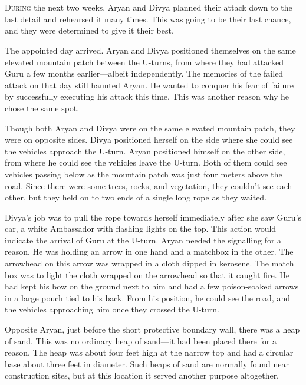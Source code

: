 \chapter{}

\lettrine{D}{uring} the next two weeks, Aryan and Divya planned their attack
down to the last detail and rehearsed it many times. This was going to be their
last chance, and they were determined to give it their best.

The appointed day arrived. Aryan and Divya positioned themselves on the same
elevated mountain patch between the U-turns, from where they had attacked Guru a
few months earlier—albeit independently. The memories of the failed attack on
that day still haunted Aryan. He wanted to conquer his fear of failure by
successfully executing his attack this time. This was another reason why he
chose the same spot.

Though both Aryan and Divya were on the same elevated mountain patch, they were
on opposite sides. Divya positioned herself on the side where she could
see the vehicles approach the U-turn. Aryan positioned himself on the other side,
from where he could see the vehicles leave the U-turn.  Both of them could see
vehicles passing below as the mountain patch was just four meters above the
road. Since there were some trees, rocks, and vegetation, they couldn't see each
other, but they held on to two ends of a single long rope as they waited.

Divya's job was to pull the rope towards herself immediately after she saw
Guru's car, a white Ambassador with flashing lights on the top. This action
would indicate the arrival of Guru at the U-turn. Aryan needed the signalling
for a reason. He was holding an arrow in one hand and a matchbox in the other.
The arrowhead on this arrow was wrapped in a cloth dipped in kerosene. The match
box was to light the cloth wrapped on the arrowhead so that it caught fire. He
had kept his bow on the ground next to him and had a few poison-soaked arrows in
a large pouch tied to his back. From his position, he could see the road, and
the vehicles approaching him once they crossed the U-turn.

Opposite Aryan, just before the short protective boundary wall, there was a heap
of sand. This was no ordinary heap of sand—it had been placed there for a
reason. The heap was about four feet high at the narrow top and had a circular
base about three feet in diameter. Such heaps of sand are normally found near
construction sites, but at this location it served another purpose altogether.

